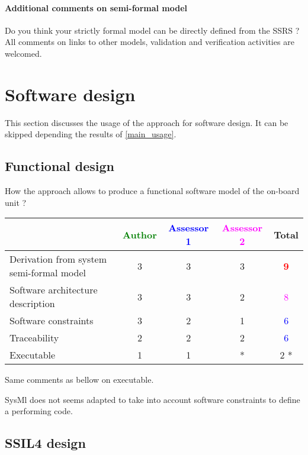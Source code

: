 \paragraph{Additional comments on semi-formal model} Do you think your strictly formal model can be directly defined from the SSRS ?
All comments on links to other models, validation and verification activities are welcomed.

\section{Software design}
This section discusses the usage of the approach for software design.
It can be skipped depending the results of \ref{main_usage}.

\subsection{Functional design}

How the approach allows to produce a functional software model of the on-board unit ?

\begin{tabular}{|l | c | c | c | c|}
\hline
& \textcolor{green}{Author} & \textcolor{blue}{Assessor 1} & \textcolor{magenta}{Assessor 2} & Total \\
\hline
Derivation from system semi-formal model & 3    & 3    & 3    & \textcolor{red}{\textbf{9}} \\
\hline
Software architecture description & 3    & 3    & 2    & \textcolor{magenta}{8} \\
\hline
Software constraints & 3    & 2    & 1    & \textcolor{blue}{6} \\
\hline
Traceability & 2    & 2    & 2    & \textcolor{blue}{6} \\
\hline
Executable & 1    & 1    & * & 2   * \\
\hline
\end{tabular}



\begin{assessor2}
Same comments as bellow on executable.

SysMl does not seems adapted to take into account software constraints to define a performing code.
\end{assessor2}

\subsection{SSIL4 design}

